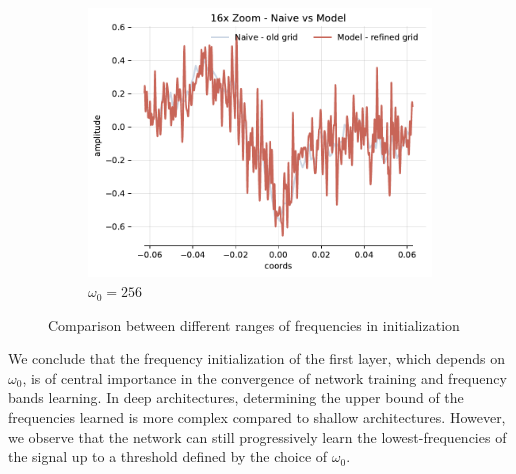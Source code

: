 \begin{figure}[h]
\begin{subfigure}[b]{0.32\textwidth}
        \centering
        \includegraphics[width=\textwidth]{img/ch3/16x-zoom-1hl-32hf-256hz.pdf}
        \caption{$\omega_0=256$}
        \label{fig:16x-zoom-1hl-32hf-256hz}
    \end{subfigure}
    \caption{Comparison between different ranges of frequencies in initialization}
    \label{f:comparison-8-to-256-hz}
\end{figure}





We conclude that the frequency initialization of the first layer, which depends on $\omega_0$, is of central importance in the convergence of network training and frequency bands learning. In deep architectures, determining the upper bound of the frequencies learned is more complex compared to shallow architectures. However, we observe that the network can still progressively learn the lowest-frequencies of the signal up to a threshold defined by the choice of $\omega_0$.

